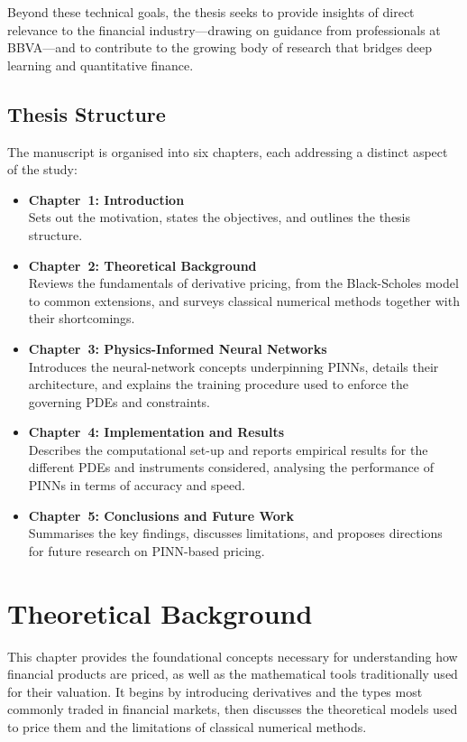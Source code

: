 \documentclass[12pt]{report} %
\theoremstyle{plain} %
\theoremstyle{definition} %
\theoremstyle{remark} %
\begin{document}
Beyond these technical goals, the thesis seeks to provide insights of direct relevance to the
financial industry—drawing on guidance from professionals at BBVA—and to contribute to the
growing body of research that bridges deep learning and quantitative finance.

\section{Thesis Structure}

The manuscript is organised into six chapters, each addressing a distinct aspect of the study:
\begin{itemize}
 \item \textbf{Chapter~1: Introduction} \\[2pt]
 Sets out the motivation, states the objectives, and outlines the thesis structure.

 \item \textbf{Chapter~2: Theoretical Background} \\[2pt]
 Reviews the fundamentals of derivative pricing, from the Black-Scholes model to common
 extensions, and surveys classical numerical methods together with their shortcomings.

 \item \textbf{Chapter~3: Physics-Informed Neural Networks} \\[2pt]
 Introduces the neural-network concepts underpinning PINNs, details their architecture,
 and explains the training procedure used to enforce the governing PDEs and constraints.

 \item \textbf{Chapter~4: Implementation and Results} \\[2pt]
 Describes the computational set-up and reports empirical results for the different PDEs
 and instruments considered, analysing the performance of PINNs in terms of accuracy and
 speed.

 \item \textbf{Chapter~5: Conclusions and Future Work} \\[2pt]
 Summarises the key findings, discusses limitations, and proposes directions for future
 research on PINN-based pricing.
\end{itemize}

\chapter{Theoretical Background}
This chapter provides the foundational concepts necessary for understanding how financial products
are priced, as well as the mathematical tools traditionally used for their valuation. It begins by
introducing derivatives and the types most commonly traded in financial markets, then discusses the
theoretical models used to price them and the limitations of classical numerical methods.
\end{document}
